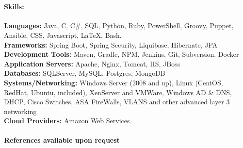 \documentclass[10pt]{article}
\begin{document}
\\
\\
\noindent\Large\textbf{Skills:}\\
\\
\normalsize
\textbf{Languages:}
\normalsize Java, C, C{\#}, SQL, Python, Ruby, PowerShell, Groovy, Puppet, Ansible, CSS, Javascript, LaTeX, Bash. \\
\textbf{Frameworks:}
\normalsize Spring Boot, Spring Security, Liquibase, Hibernate, JPA \\
\textbf{Development Tools:}
\normalsize Maven, Gradle, NPM, Jenkins, Git, Subversion, Docker \\
\textbf{Application Servers:}
\normalsize Apache, Nginx, Tomcat, IIS, JBoss \\
\textbf{Databases:}
\normalsize SQLServer, MySQL, Postgres, MongoDB \\
\textbf{Systems/Networking:}
\normalsize Windows Server (2008 and up), Linux (CentOS, RedHat, Ubuntu, included), XenServer and VMWare, Windows AD \& DNS, DHCP, 
Cisco Switches, ASA FireWalls, VLANS and other advanced layer 3 networking \\
\textbf{Cloud Providers:}
\normalsize Amazon Web Services
\\
\\
\noindent\Large\textbf{References available upon request}
\end{document}
